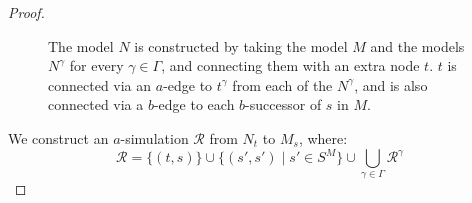 \begin{proof}
\begin{figure}
\begin{center} %
\caption{
The model $N$ is constructed by taking the model $M$ and the models $N^\gamma$
for every $\gamma \in \Gamma$, and connecting them with an extra node $t$. $t$
is connected via an $a$-edge to $t^\gamma$ from each of the $N^\gamma$, and is
also connected via a $b$-edge to each $b$-successor of $s$ in $M$.
}
\end{center}
\end{figure}

We construct an $a$-simulation $\mathcal{R}$ from $N_t$ to $M_s$, where:
$$\mathcal{R} = \{(t, s)\} \cup \{(s', s') \mid s' \in S^M \} 
\cup \bigcup_{\gamma \in \Gamma} \mathcal{R}^\gamma$$


\end{proof}
